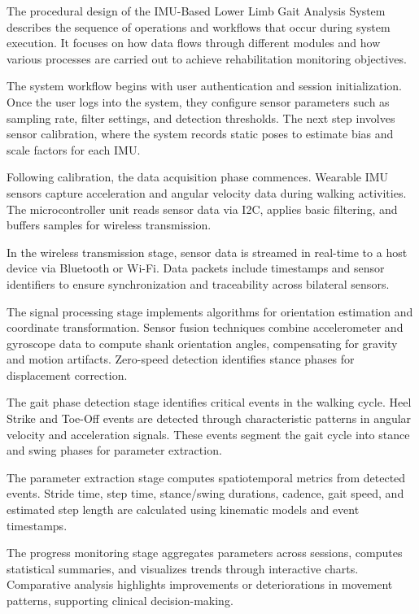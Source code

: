 \documentclass[12pt,a4paper]{report}
\begin{document}
The procedural design of the IMU-Based Lower Limb Gait Analysis System describes the sequence of operations and workflows that occur during system execution. It focuses on how data flows through different modules and how various processes are carried out to achieve rehabilitation monitoring objectives.

The system workflow begins with user authentication and session initialization. Once the user logs into the system, they configure sensor parameters such as sampling rate, filter settings, and detection thresholds. The next step involves sensor calibration, where the system records static poses to estimate bias and scale factors for each IMU.

Following calibration, the data acquisition phase commences. Wearable IMU sensors capture acceleration and angular velocity data during walking activities. The microcontroller unit reads sensor data via I2C, applies basic filtering, and buffers samples for wireless transmission.

In the wireless transmission stage, sensor data is streamed in real-time to a host device via Bluetooth or Wi-Fi. Data packets include timestamps and sensor identifiers to ensure synchronization and traceability across bilateral sensors.

The signal processing stage implements algorithms for orientation estimation and coordinate transformation. Sensor fusion techniques combine accelerometer and gyroscope data to compute shank orientation angles, compensating for gravity and motion artifacts. Zero-speed detection identifies stance phases for displacement correction.

The gait phase detection stage identifies critical events in the walking cycle. Heel Strike and Toe-Off events are detected through characteristic patterns in angular velocity and acceleration signals. These events segment the gait cycle into stance and swing phases for parameter extraction.

The parameter extraction stage computes spatiotemporal metrics from detected events. Stride time, step time, stance/swing durations, cadence, gait speed, and estimated step length are calculated using kinematic models and event timestamps.

The progress monitoring stage aggregates parameters across sessions, computes statistical summaries, and visualizes trends through interactive charts. Comparative analysis highlights improvements or deteriorations in movement patterns, supporting clinical decision-making.
\end{document}
